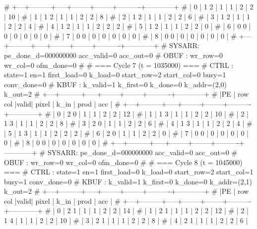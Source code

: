 # +---+---------+-----+--------+--------+----------+------------+
# | 0 |   1   2 |  1  |      1 |      2 |        2 |         10 |
# | 1 |   1   2 |  1  |      1 |      2 |        2 |          8 |
# | 2 |   1   2 |  1  |      1 |      2 |        2 |          6 |
# | 3 |   1   2 |  1  |      1 |      2 |        2 |          4 |
# | 4 |   1   2 |  1  |      1 |      2 |        2 |          2 |
# | 5 |   1   2 |  1  |      1 |      2 |        2 |          0 |
# | 6 |   0   0 |  0  |      0 |      0 |        0 |          0 |
# | 7 |   0   0 |  0  |      0 |      0 |        0 |          0 |
# | 8 |   0   0 |  0  |      0 |      0 |        0 |          0 |
# +---+---------+-----+--------+--------+----------+------------+
# SYSARR: pe_done_d=000000000 acc_valid=0 acc_out=0
# OBUF : wr_row=0 wr_col=0 ofm_done=0
# 
# === Cycle 7  (t = 1035000) ===
# CTRL : state=1 en=1 first_load=0 k_load=0 start_row=2 start_col=0 busy=1 conv_done=0
# KBUF : k_valid=1 k_first=0 k_done=0 k_addr=(2,0) k_out=2
# +---+---------+-----+--------+--------+----------+------------+
# |PE | row col |valid| pixel  |  k_in  |   prod   |    acc     |
# +---+---------+-----+--------+--------+----------+------------+
# | 0 |   2   0 |  1  |      1 |      2 |        2 |         12 |
# | 1 |   1   3 |  1  |      1 |      2 |        2 |         10 |
# | 2 |   1   3 |  1  |      1 |      2 |        2 |          8 |
# | 3 |   2   0 |  1  |      1 |      2 |        2 |          6 |
# | 4 |   1   3 |  1  |      1 |      2 |        2 |          4 |
# | 5 |   1   3 |  1  |      1 |      2 |        2 |          2 |
# | 6 |   2   0 |  1  |      1 |      2 |        2 |          0 |
# | 7 |   0   0 |  0  |      0 |      0 |        0 |          0 |
# | 8 |   0   0 |  0  |      0 |      0 |        0 |          0 |
# +---+---------+-----+--------+--------+----------+------------+
# SYSARR: pe_done_d=000000000 acc_valid=0 acc_out=0
# OBUF : wr_row=0 wr_col=0 ofm_done=0
# 
# === Cycle 8  (t = 1045000) ===
# CTRL : state=1 en=1 first_load=0 k_load=0 start_row=2 start_col=1 busy=1 conv_done=0
# KBUF : k_valid=1 k_first=0 k_done=0 k_addr=(2,1) k_out=2
# +---+---------+-----+--------+--------+----------+------------+
# |PE | row col |valid| pixel  |  k_in  |   prod   |    acc     |
# +---+---------+-----+--------+--------+----------+------------+
# | 0 |   2   1 |  1  |      1 |      2 |        2 |         14 |
# | 1 |   2   1 |  1  |      1 |      2 |        2 |         12 |
# | 2 |   1   4 |  1  |      1 |      2 |        2 |         10 |
# | 3 |   2   1 |  1  |      1 |      2 |        2 |          8 |
# | 4 |   2   1 |  1  |      1 |      2 |        2 |          6 |
